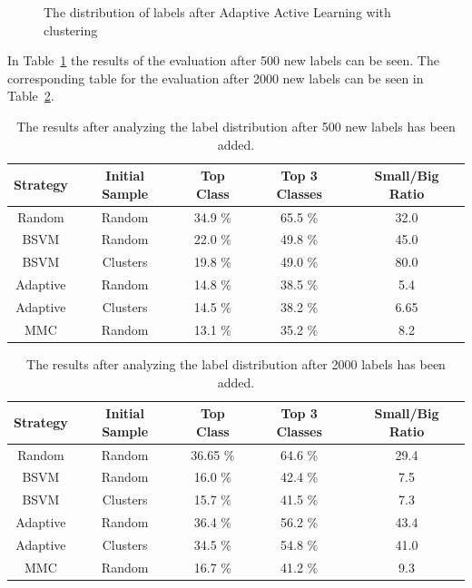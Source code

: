 \begin{figure}
    \centering
    \caption{The distribution of labels after Adaptive Active Learning with clustering}
    \label{fig:class-distribution-reuters-adaptive-clusters}
\end{figure}

In Table~\ref{tab:distribution-result-500} the results of the evaluation after 500 new labels can be seen.
The corresponding table for the evaluation after 2000 new labels can be seen in Table~\ref{tab:distribution-result-2000}.

\begin{table}
    \centering
    \begin{tabular}{|ccccc|}
        \hline
        \textbf{Strategy} & \textbf{Initial Sample} & \textbf{Top Class} & \textbf{Top 3 Classes} & \textbf{Small/Big Ratio}\\
        \hline
        Random & Random &  34.9 \% & 65.5 \% & 32.0 \\
        BSVM & Random &  22.0 \% & 49.8 \% & 45.0 \\
        BSVM & Clusters & 19.8 \% & 49.0 \% & 80.0 \\
        Adaptive & Random & 14.8 \% & 38.5 \% & 5.4 \\
        Adaptive & Clusters & 14.5 \% & 38.2 \% & 6.65 \\
        MMC & Random & 13.1 \% & 35.2 \% & 8.2 \\
        \hline
    \end{tabular}
    \caption{The results after analyzing the label distribution after 500 new labels has been added.}
    \label{tab:distribution-result-500}
\end{table}

\begin{table}
    \centering
    \begin{tabular}{|ccccc|}
        \hline
        \textbf{Strategy} & \textbf{Initial Sample} & \textbf{Top Class} & \textbf{Top 3 Classes} & \textbf{Small/Big Ratio}\\
        \hline
        Random & Random & 36.65 \% & 64.6 \% & 29.4 \\
        BSVM & Random & 16.0 \% & 42.4 \% & 7.5 \\
        BSVM & Clusters & 15.7 \% & 41.5 \% & 7.3 \\
        Adaptive & Random & 36.4 \% & 56.2 \% & 43.4 \\
        Adaptive & Clusters & 34.5 \% & 54.8 \% & 41.0 \\
        MMC & Random & 16.7 \% & 41.2 \% & 9.3 \\
        \hline
    \end{tabular}
    \caption{The results after analyzing the label distribution after 2000 labels has been added.}
    \label{tab:distribution-result-2000}
\end{table}

